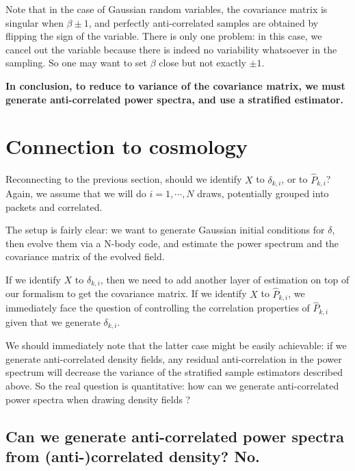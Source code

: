 \documentclass{aastex6}
\begin{document}
Note that in the case of Gaussian random variables, the covariance matrix is singular when $\beta \pm 1$, and perfectly anti-correlated samples are obtained by flipping the sign of the variable. There is only one problem: in this case, we cancel out the variable because there is indeed no variability whatsoever in the sampling. So one may  want to set $\beta$ close but not exactly $\pm1$.

\textbf{In conclusion, to reduce to variance of the covariance matrix, we must generate anti-correlated power spectra, and use a stratified estimator.}

\section{Connection to cosmology}

Reconnecting to the previous section, should we identify $X$ to $\delta_{k, i}$, or to $\hat{P}_{k,i}$? Again, we assume that we will do $i=1, \cdots, N$ draws, potentially grouped into packets and correlated.

The setup is fairly clear: we want to generate Gaussian initial conditions for $\delta$, then evolve them via a N-body code, and estimate the power spectrum and the covariance matrix of the evolved field. 

If we identify $X$ to $\delta_{k, i}$, then we need to add another layer of estimation on top of our formalism to get the covariance matrix. 
If we identify $X$ to $\hat{P}_{k,i}$, we immediately face the question of controlling the correlation properties of $\hat{P}_{k,i}$ given that we generate $\delta_{k, i}$.

We should immediately note that the latter case might be easily achievable: if we generate anti-correlated density fields, any residual anti-correlation in the power spectrum will decrease the variance of the stratified sample estimators described above. So the real question is quantitative: how can we generate anti-correlated power spectra when drawing density fields ?


\subsection{Can we generate anti-correlated power spectra from (anti-)correlated density? No.}
\end{document}
